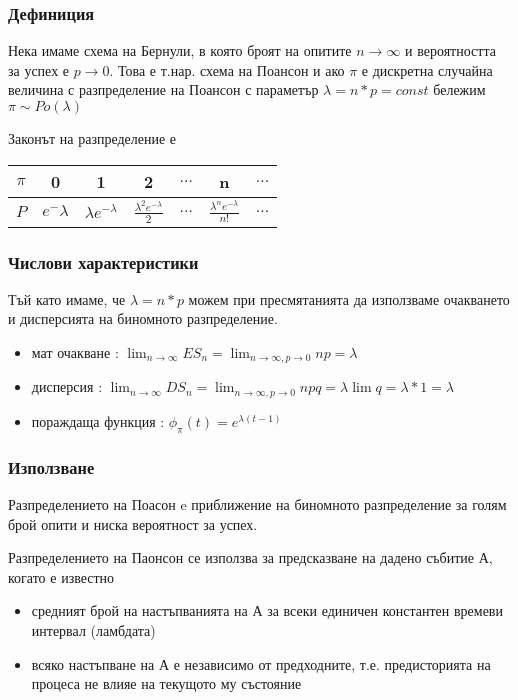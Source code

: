 \documentclass[fleqn,12pt]{article}
\begin{document}
\begin{justify}
\subsubsection{Дефиниция}
Нека имаме схема на Бернули, в която броят на опитите $n \rightarrow \infty$ и вероятността за успех е 
$p \rightarrow 0$. Това е т.нар. схема на Поансон и ако $\pi$ е дискретна случайна величина с разпределение на 
Поансон с параметър $\lambda = n*p = const$ бележим $\pi \sim Po(\lambda)$

Законът на разпределение е

\begin{tabular}{|c|c|c|c|c|c|c|}
    \hline
    $\pi$ & 0 & 1 & 2 & $\dots$ & n & $\dots$ \\
    \hline
    $P$ & $e^-\lambda$ & $\lambda e^{-\lambda}$ & $\frac{\lambda^2 e^{-\lambda}}{2}$ & $\dots$ & $\frac{\lambda^n
    e^{-\lambda}}{n!}$& $\dots$ \\
    \hline
\end{tabular}

\subsubsection{Числови характеристики} 
Тъй като имаме, че $\lambda = n*p$ можем при пресмятанията да използваме очакването и дисперсията на биномното 
разпределение. 
\begin{itemize}
    \item мат очакване : $\lim_{n \rightarrow \infty} ES_n = \lim_{n \rightarrow \infty, p \rightarrow 0} np = \lambda$
    \item дисперсия : $\lim_{n \rightarrow \infty} DS_n = \lim_{n \rightarrow \infty, p \rightarrow 0} npq = \lambda
    \lim q = \lambda * 1 = \lambda$
    \item пораждаща функция : $\phi_\pi(t) = e^{\lambda(t-1)}$
\end{itemize}
\subsubsection{Използване} 
Разпределението на Поасон e приближение на биномното разпределение за голям брой опити и ниска вероятност за успех.

Разпределението на Паонсон се използва за предсказване на дадено събитие А, когато е известно
\begin{itemize}
    \item средният брой на настъпванията на А за всеки единичен константен времеви интервал (ламбдата)
    \item всяко настъпване на А е независимо от предходните, т.е. предисторията на процеса не влияе на текущото му 
    състояние
\end{itemize}


\end{justify}
\end{document}
